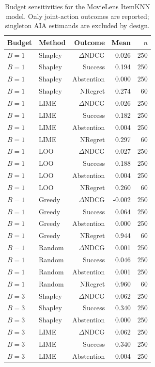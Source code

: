 \begin{table}[t]\centering\scriptsize
\caption{Budget sensitivities for the MovieLens ItemKNN model. Only joint-action outcomes are reported; singleton AIA estimands are excluded by design.}
\label{tab:appC2}
\begin{tabular}{llrrr}
\toprule
Budget & Method & Outcome & Mean & $n$ \\
\midrule
$B=1$ & Shapley & $\Delta$NDCG & 0.026 & 250 \\
$B=1$ & Shapley & Success & 0.194 & 250 \\
$B=1$ & Shapley & Abstention & 0.000 & 250 \\
$B=1$ & Shapley & NRegret & 0.274 & 60 \\
$B=1$ & LIME & $\Delta$NDCG & 0.026 & 250 \\
$B=1$ & LIME & Success & 0.182 & 250 \\
$B=1$ & LIME & Abstention & 0.004 & 250 \\
$B=1$ & LIME & NRegret & 0.297 & 60 \\
$B=1$ & LOO & $\Delta$NDCG & 0.027 & 250 \\
$B=1$ & LOO & Success & 0.188 & 250 \\
$B=1$ & LOO & Abstention & 0.004 & 250 \\
$B=1$ & LOO & NRegret & 0.260 & 60 \\
$B=1$ & Greedy & $\Delta$NDCG & -0.002 & 250 \\
$B=1$ & Greedy & Success & 0.064 & 250 \\
$B=1$ & Greedy & Abstention & 0.000 & 250 \\
$B=1$ & Greedy & NRegret & 0.944 & 60 \\
$B=1$ & Random & $\Delta$NDCG & 0.001 & 250 \\
$B=1$ & Random & Success & 0.046 & 250 \\
$B=1$ & Random & Abstention & 0.001 & 250 \\
$B=1$ & Random & NRegret & 0.960 & 60 \\
\midrule
$B=3$ & Shapley & $\Delta$NDCG & 0.062 & 250 \\
$B=3$ & Shapley & Success & 0.340 & 250 \\
$B=3$ & Shapley & Abstention & 0.000 & 250 \\
$B=3$ & LIME & $\Delta$NDCG & 0.062 & 250 \\
$B=3$ & LIME & Success & 0.340 & 250 \\
$B=3$ & LIME & Abstention & 0.004 & 250 \\

\end{tabular}
\end{table}
